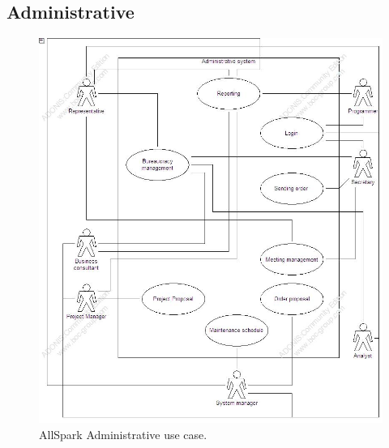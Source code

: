 \subsection{Administrative}
\begin{figure}
\begin{centering}
\includegraphics[scale=0.45]{assign3/adonis/imgs/administrative.jpg}
\caption{AllSpark Administrative use case.}
\label{2img:[use]administrative}
\end{centering}
\end{figure}

